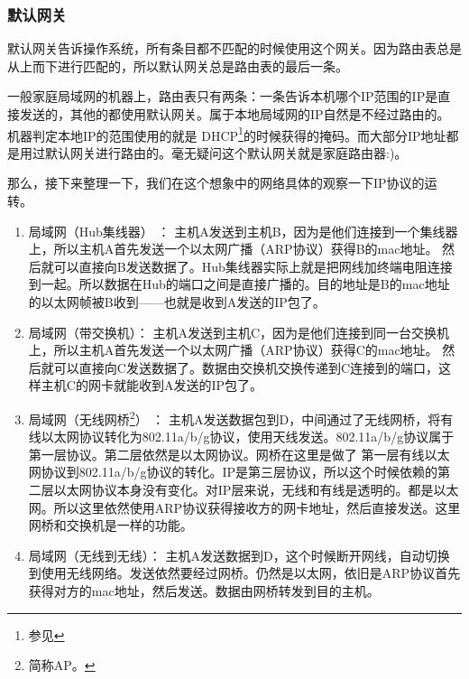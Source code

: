\begin{insertnote}
\subsubsection*{默认网关}

默认网关告诉操作系统，所有条目都不匹配的时候使用这个网关。因为路由表总是从上而下进行匹配的，所以默认网关总是路由表的最后一条。

一般家庭局域网的机器上，路由表只有两条：一条告诉本机哪个IP范围的IP是直接发送的，其他的都使用默认网关。属于本地局域网的IP自然是不经过路由的。机器判定本地IP的范围使用的就是
DHCP\footnote{参见}的时候获得的掩码。而大部分IP地址都是用过默认网关进行路由的。毫无疑问这个默认网关就是家庭路由器:)。

\end{insertnote}

那么，接下来整理一下，我们在这个想象中的网络具体的观察一下IP协议的运转。

\begin{enumerate}

\item 局域网（Hub集线器） ： 主机A发送到主机B，因为是他们连接到一个集线器上，所以主机A首先发送一个以太网广播（ARP协议）获得B的mac地址。
然后就可以直接向B发送数据了。Hub集线器实际上就是把网线加终端电阻连接到一起。所以数据在Hub的端口之间是直接广播的。目的地址是B的mac地址的以太网帧被B收到——也就是收到A发送的IP包了。

\item 局域网（带交换机）： 主机A发送到主机C，因为是他们连接到同一台交换机上，所以主机A首先发送一个以太网广播（ARP协议）获得C的mac地址。
然后就可以直接向C发送数据了。数据由交换机交换传递到C连接到的端口，这样主机C的网卡就能收到A发送的IP包了。

\item 局域网（无线网桥\footnote{简称AP。}） ： 主机A发送数据包到D，中间通过了无线网桥，将有线以太网协议转化为802.11a/b/g协议，使用天线发送。802.11a/b/g协议属于第一层协议。第二层依然是以太网协议。网桥在这里是做了
第一层有线以太网协议到802.11a/b/g协议的转化。IP是第三层协议，所以这个时候依赖的第二层以太网协议本身没有变化。对IP层来说，无线和有线是透明的。都是以太网。所以这里依然使用ARP协议获得接收方的网卡地址，然后直接发送。这里网桥和交换机是一样的功能。

\item 局域网（无线到无线）： 主机A发送数据到D，这个时候断开网线，自动切换到使用无线网络。发送依然要经过网桥。仍然是以太网，依旧是ARP协议首先获得对方的mac地址，然后发送。数据由网桥转发到目的主机。

\end{enumerate}

